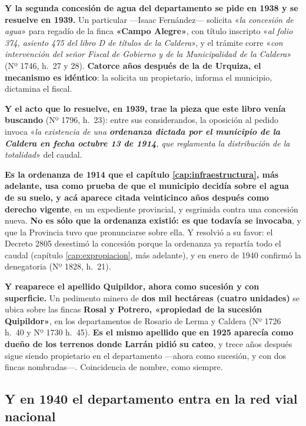 \begin{cautela}
\textbf{Y la segunda concesión de agua del departamento se pide en 1938 y se
resuelve en 1939.} Un particular ---Isaac Fernández--- solicita «\textit{la
concesión de agua}» para regadío de la finca \textbf{«Campo Alegre»}, con título
inscripto «\textit{al folio 374, asiento 475 del libro D de títulos de la
Caldera}», y el trámite corre «\textit{con intervención del señor Fiscal de
Gobierno y de la Municipalidad de la Caldera}» (Nº 1746, h.\ 27 y 28).
\textbf{Catorce años después de la de Urquiza, el mecanismo es idéntico}: la
solicita un propietario, informa el municipio, dictamina el fiscal.

\textbf{Y el acto que lo resuelve, en 1939, trae la pieza que este libro venía
buscando} (Nº 1796, h.\ 23): entre sus considerandos, la oposición al pedido
invoca «\textit{la existencia de una \textbf{ordenanza dictada por el municipio
de la Caldera en fecha octubre 13 de 1914}, que reglamenta la distribución de la
totalidad}» del caudal.

\textbf{Es la ordenanza de 1914 que el capítulo \ref{cap:infraestructura}, más adelante, usa
como prueba de que el municipio decidía sobre el agua de su suelo, y acá aparece
citada veinticinco años después como derecho vigente}, en un expediente
provincial, y esgrimida contra una concesión nueva. \textbf{No es sólo que la
ordenanza existió: es que todavía se invocaba}, y que la Provincia tuvo que
pronunciarse sobre ella. Y resolvió a su favor: el Decreto 2805 desestimó la concesión porque la ordenanza ya repartía todo el caudal (capítulo \ref{cap:expropiacion}, más adelante), y en enero de 1940 confirmó la denegatoria (Nº 1828, h.\ 21).

\textbf{Y reaparece el apellido Quipildor, ahora como sucesión y con
superficie.} Un pedimento minero de \textbf{dos mil hectáreas (cuatro unidades)}
se ubica sobre las fincas \textbf{Rosal y Potrero, «propiedad de la sucesión
Quipildor»}, en los departamentos de Rosario de Lerma y Caldera (Nº 1726 h.\ 40
y Nº 1730 h.\ 45). \textbf{Es el mismo apellido que en 1925 aparecía como dueño
de los terrenos donde Larrán pidió su cateo}, y trece años después sigue siendo
propietario en el departamento ---ahora como sucesión, y con dos fincas
nombradas---. Coincidencia de nombre, como siempre.

\subsection*{Y en 1940 el departamento entra en la red vial nacional}


\end{cautela}
